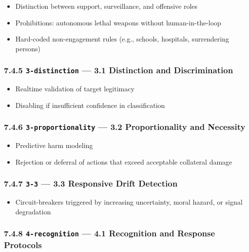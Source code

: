 \documentclass[11pt]{article}
\begin{document}
\begin{itemize}\setlength\itemsep{0pt}
\item Distinction between support, surveillance, and offensive roles
\item Prohibitions: autonomous lethal weapons without human-in-the-loop
\item Hard-coded non-engagement rules (e.g., schools, hospitals, surrendering persons)
\end{itemize}


\subsubsection*{7.4.5 \texttt{3-distinction} — 3.1 Distinction and Discrimination}


\begin{itemize}\setlength\itemsep{0pt}
\item Realtime validation of target legitimacy
\item Disabling if insufficient confidence in classification
\end{itemize}


\subsubsection*{7.4.6 \texttt{3-proportionality} — 3.2 Proportionality and Necessity}


\begin{itemize}\setlength\itemsep{0pt}
\item Predictive harm modeling
\item Rejection or deferral of actions that exceed acceptable collateral damage
\end{itemize}


\subsubsection*{7.4.7 \texttt{3-3} — 3.3 Responsive Drift Detection}


\begin{itemize}\setlength\itemsep{0pt}
\item Circuit-breakers triggered by increasing uncertainty, moral hazard, or signal degradation
\end{itemize}


\subsubsection*{7.4.8 \texttt{4-recognition} — 4.1 Recognition and Response Protocols}
\end{document}
